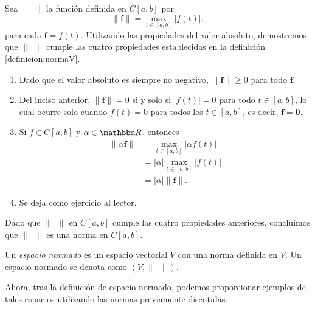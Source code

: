 \begin{examplebox}{}{}
    Sea $\| \phantom{x} \|$ la función definida en $C[a, b]$ por
    $$\| \mathbf{f} \| = \max_{t \in [a, b]} |f(t)|,$$
    para cada $\mathbf{f} = f(t)$. Utilizando las propiedades del valor absoluto, demostremos que $\| \phantom{x} \|$ cumple las cuatro propiedades establecidas en la definición \ref{definicion:normaV}.
    \begin{enumerate}[label=\roman*), topsep=6pt, itemsep=0pt]
        \item Dado que el valor absoluto es siempre no negativo, $\| \mathbf{f} \| \geq 0$ para todo $\mathbf{f}$.
        \item Del inciso anterior, $\| \mathbf{f} \| = 0$ si y solo si $|f(t)| = 0$ para todo $t \in [a, b]$, lo cual ocurre solo cuando $f(t) = 0$ para todos los $t \in [a, b]$, es decir, $\mathbf{f} = \mathbf{0}$.
        \item Si $f \in C[a, b]$ y $\alpha \in \RR$, entonces
        \begin{align*}
            \| \alpha \mathbf{f} \| & = \max_{t \in [a, b]} |\alpha f(t)| \\
            & = |\alpha| \max_{t \in [a, b]} |f(t)| \\
            & = |\alpha| \| \mathbf{f} \|.
        \end{align*}
        \item Se deja como ejercicio al lector.
    \end{enumerate}
    Dado que $\| \phantom{x} \|$ en $C[a, b]$ cumple las cuatro propiedades anteriores, concluimos que $\| \phantom{x} \|$ es una norma en $C[a, b]$.
\end{examplebox}

\newpage

\begin{definicion}{}{}
    Un \emph{espacio normado} es un espacio vectorial $V$ con una norma definida en $V$. Un espacio normado se denota como $(V, \| \phantom{x} \|)$.
\end{definicion}

Ahora, tras la definición de espacio normado, podemos proporcionar ejemplos de tales espacios utilizando las normas previamente discutidas.

